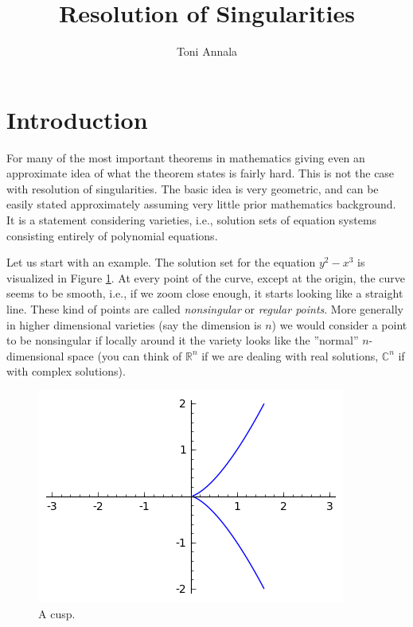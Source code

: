 \documentclass[12pt,a4paper,leqno]{article}
\title{Resolution of Singularities}
\author{Toni Annala}
\date{}
\newcommand{\R}{\mathbb{R}}
\newcommand{\C}{\mathbb{C}}
\newcommand{\fref}[1]{\hyperref[{#1}]{\ref*{#1}}}
\theoremstyle{plain}
\theoremstyle{definition}
\theoremstyle{remark}
\begin{document}
\maketitle

\tableofcontents

\section{Introduction}

For many of the most important theorems in mathematics giving even an approximate idea of what the theorem states is fairly hard. This is not the case with resolution of singularities. The basic idea is very geometric, and can be easily stated approximately assuming very little prior mathematics background. It is a statement considering varieties, i.e., solution sets of equation systems consisting entirely of polynomial equations.

Let us start with an example. The solution set for the equation $y^2 - x^3$ is visualized in Figure \fref{cusp1}. At every point of the curve, except at the origin, the curve seems to be smooth, i.e., if we zoom close enough, it starts looking like a straight line. These kind of points are called \emph{nonsingular} or \emph{regular points}. More generally in higher dimensional varieties (say the dimension is $n$) we would consider a point to be nonsingular if locally around it the variety looks like the ''normal'' $n$-dimensional space (you can think of $\R^n$ if we are dealing with real solutions, $\C^n$ if with complex solutions).  

\begin{figure}[!htbp]\label{cusp1}
\begin{center}
\includegraphics{pics/cusp.png}
\caption{A cusp.}
\end{center}
\end{figure}
\end{document}
